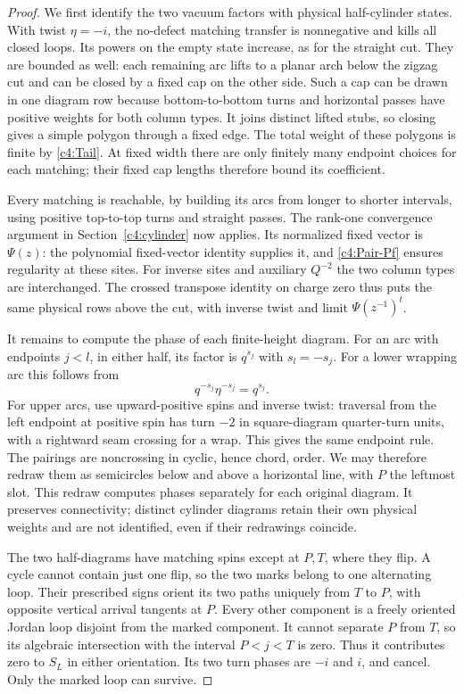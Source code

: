 \begin{proof}
We first identify the two vacuum factors with physical half-cylinder
states. With twist $\eta=-i$, the no-defect matching transfer is
nonnegative and kills all closed loops. Its powers on the empty state
increase, as for the straight cut. They are bounded as well: each
remaining arc lifts to a planar arch below the zigzag cut and can be
closed by a fixed cap on the other side. Such a cap can be drawn in one
diagram row because bottom-to-bottom turns and horizontal passes have
positive weights for both column types. It joins distinct lifted stubs,
so closing gives a simple polygon through a fixed edge. The total
weight of these polygons is finite by \eqref{c4:Tail}. At fixed width
there are only finitely many endpoint choices for each matching; their
fixed cap lengths therefore bound its coefficient.

Every matching is reachable, by building its arcs from longer to shorter
intervals, using positive top-to-top turns and straight passes. The
rank-one convergence argument in Section~\ref{c4:cylinder} now applies.
Its normalized fixed vector is $\Psi(z)$: the polynomial fixed-vector
identity supplies it, and \eqref{c4:Pair-Pf} ensures regularity at these
sites. For inverse sites and auxiliary $Q^{-2}$ the two column types
are interchanged. The crossed transpose identity on charge zero thus
puts the same physical rows above the cut, with inverse twist and limit
$\Psi(z^{-1})^t$.

It remains to compute the phase of each finite-height diagram.
For an arc with endpoints $j<l$, in either half, its factor is
$q^{s_j}$ with $s_l=-s_j$. For a lower wrapping arc this follows from
\[
 q^{-s_j}\eta^{-s_j}=q^{s_j}.
\]
For upper arcs, use upward-positive spins and inverse twist: traversal
from the left endpoint at positive spin has turn $-2$ in square-diagram
quarter-turn units, with a rightward seam crossing for a wrap. This
gives the same endpoint rule. The pairings are noncrossing in cyclic,
hence chord, order. We may therefore redraw them as semicircles below
and above a horizontal line, with $P$ the leftmost slot. This redraw
computes phases separately for each original diagram. It preserves
connectivity; distinct cylinder diagrams retain their own physical
weights and are not identified, even if their redrawings coincide.

The two half-diagrams have matching spins except at $P,T$, where they
flip. A cycle cannot contain just one flip, so the two marks belong to
one alternating loop. Their prescribed signs orient its two paths
uniquely from $T$ to $P$, with opposite vertical arrival tangents at $P$.
Every other component is a freely oriented Jordan loop disjoint from
the marked component. It cannot separate $P$ from $T$, so its algebraic
intersection with the interval $P<j<T$ is zero. Thus it contributes zero
to $S_L$ in either orientation. Its two turn phases are $-i$ and $i$,
and cancel. Only the marked loop can survive.


\end{proof}
